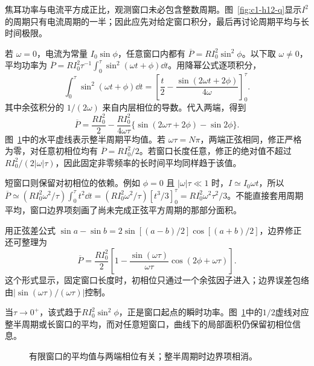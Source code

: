 \begin{solution}
焦耳功率与电流平方成正比，观测窗口未必包含整数周期。图~\ref{fig:c1-h12-q}显示$I^2$的周期只有电流周期的一半；因此应先对给定窗口积分，最后再讨论周期平均与长时间极限。


若 $\omega=0$，电流为常量 $I_0\sin\phi$，任意窗口内都有 $\overline P=RI_0^2\sin^2\phi$。以下取 $\omega\ne0$，平均功率为 $\overline P=RI_0^2\tau^{-1}\int_0^\tau\sin^2(\omega t+\phi)\dd t$。用降幂公式逐项积分，
\[
\int_0^\tau\sin^2(\omega t+\phi)\dd t
=\left[\frac t2-\frac{\sin(2\omega t+2\phi)}{4\omega}\right]_0^\tau.
\]
其中余弦积分的 $1/(2\omega)$ 来自内层相位的导数。代入两端，得到
\[\boxed{\overline P=\frac{RI_0^2}{2}-
\frac{RI_0^2}{4\omega\tau}\{\sin(2\omega\tau+2\phi)-\sin2\phi\}}.
\]
图~\ref{fig:c1-h12-s}中的水平虚线表示整半周期平均值。若 $\omega\tau=N\pi$，两端正弦相同，修正严格为零，对任意初相位均有 $\overline P=RI_0^2/2$。若窗口长度任意，修正的绝对值不超过 $RI_0^2/(2|\omega|\tau)$，因此固定非零频率的长时间平均同样趋于该值。

短窗口则保留对初相位的依赖。例如 $\phi=0$ 且 $|\omega|\tau\ll1$ 时，$I\simeq I_0\omega t$，所以 $\overline P\simeq(RI_0^2\omega^2/\tau)\int_0^\tau t^2\dd t=(RI_0^2\omega^2/\tau)[t^3/3]_0^\tau=RI_0^2\omega^2\tau^2/3$。不能直接套用周期平均，窗口边界项刻画了尚未完成正弦平方周期的那部分面积。


用正弦差公式 $\sin a-\sin b=2\sin[(a-b)/2]\cos[(a+b)/2]$，边界修正还可整理为
\[\overline P=\frac{RI_0^2}{2}\left[1-
\frac{\sin(\omega\tau)}{\omega\tau}\cos(2\phi+\omega\tau)\right].\]
这个形式显示，固定窗口长度时，初相位只通过一个余弦因子进入；边界误差包络由$|\sin(\omega\tau)/(\omega\tau)|$控制。

当$\tau\to0^+$，该式趋于$RI_0^2\sin^2\phi$，正是窗口起点的瞬时功率。图~\ref{fig:c1-h12-s}中的$1/2$虚线对应整半周期或长窗口的平均，而对任意短窗口，曲线下的局部面积仍保留初相位信息。

\begin{figure}[H]\centering
{}
\caption{有限窗口的平均值与两端相位有关；整半周期时边界项相消。}\label{fig:c1-h12-s}
\end{figure}
\end{solution}


